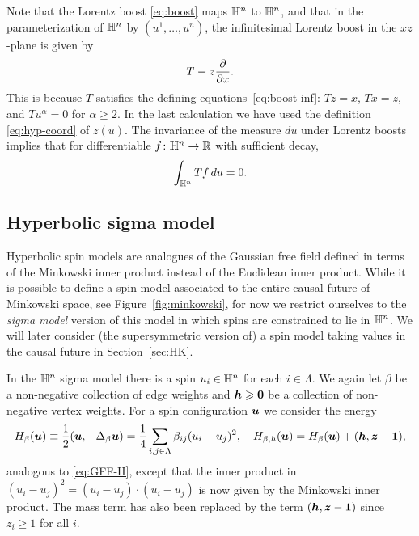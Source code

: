 \documentclass[11pt,a4paper]{article}
\begin{document}
Note that the Lorentz boost \eqref{eq:boost} maps $\mathbb{H}^{n}$ to
$\mathbb{H}^{n}$, and that in the parameterization of $\mathbb{H}^{n}$ by
$(u^1, \dots, u^n)$, the infinitesimal Lorentz boost in the $xz$-plane
is given by
\begin{equation}
  \label{eq:gen-hyp-1}
  T \equiv z\frac{\partial }{\partial x}.
\end{equation}
This is because $T$ satisfies the defining
equations~\eqref{eq:boost-inf}:
$Tz=x$, $Tx = z$, and $Tu^{\alpha}=0$ for $\alpha\geq 2$.
In the last calculation we have used the
definition \eqref{eq:hyp-coord} of $z(u)$.  The invariance of the
measure $du$ under Lorentz boosts implies that for differentiable
$f\colon\mathbb{H}^{n}\to \mathbb{R}$ with sufficient decay,
\begin{equation}
  \label{eq:IBP-hyp}
  \int_{\mathbb{H}^{n}}Tf\,du = 0. 
\end{equation}

\subsection{Hyperbolic sigma model}

Hyperbolic spin models are analogues of the Gaussian free field
defined in terms of the Minkowski inner product instead of the
Euclidean inner product. While it is possible to define a spin model
associated to the entire causal future of Minkowski space, see
Figure~\ref{fig:minkowski}, for now we restrict ourselves to the
\emph{sigma model} version of this model in which spins are constrained
to lie in $\mathbb{H}^n$.  We will later consider (the
supersymmetric version of) a spin model taking values in the
causal future in Section~\ref{sec:HK}.

In the $\mathbb{H}^{n}$ sigma model there is a spin $u_i\in \mathbb{H}^n$ for each
$i \in\Lambda$. We again let $\beta$ be a non-negative
collection of edge weights and $\boldsymbol{h}\geqslant \boldsymbol{0}$ be a collection of
non-negative vertex weights. For a spin configuration $\boldsymbol{u}$ we consider the
energy
\begin{equation}
  \label{eq:H-Hn}
  H_{\beta}(\boldsymbol{u}) \equiv \frac{1}{2} (\boldsymbol{u},-\Delta_\beta \boldsymbol{u})
  = \frac{1}{4}\sum_{i,j\in\Lambda}\beta_{ij} (u_{i}-u_{j})^{2},
  \quad
  H_{\beta,h}(\boldsymbol{u}) = H_{\beta}(\boldsymbol{u}) + (\boldsymbol{h},\boldsymbol{z}-\boldsymbol{1}),
\end{equation}
analogous to \eqref{eq:GFF-H}, except that the inner product in
$(u_{i}-u_{j})^{2} = (u_{i}-u_{j})\cdot (u_{i}-u_{j})$ is now given by
the Minkowski inner product.
The mass term has also been replaced by the term $(\boldsymbol{h},\boldsymbol{z}-\boldsymbol{1})$
since $z_{i}\geq 1$ for all $i$.
\end{document}
